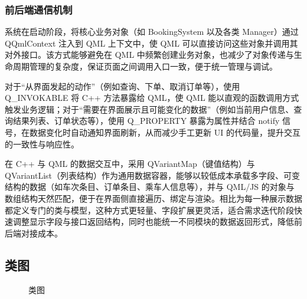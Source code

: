 \documentclass{article}
\begin{document}
			\subsubsection{前后端通信机制}
				系统在启动阶段，将核心业务对象（如 BookingSystem 以及各类 Manager）通过 QQmlContext 注入到 QML 上下文中，使 QML 可以直接访问这些对象并调用其对外接口。该方式能够避免在 QML 中频繁创建业务对象，也减少了对象传递与生命周期管理的复杂度，保证页面之间调用入口一致，便于统一管理与调试。
				
				对于“从界面发起的动作”（例如查询、下单、取消订单等），使用 Q\_INVOKABLE 将 C++ 方法暴露给 QML，使 QML 能以直观的函数调用方式触发业务逻辑；对于“需要在界面展示且可能变化的数据”（例如当前用户信息、查询结果列表、订单状态等），使用 Q\_PROPERTY 暴露为属性并结合 notify 信号，在数据变化时自动通知界面刷新，从而减少手工更新 UI 的代码量，提升交互的一致性与响应性。

				在 C++ 与 QML 的数据交互中，采用 QVariantMap（键值结构）与 QVariantList（列表结构）作为通用数据容器，能够以较低成本承载多字段、可变结构的数据（如车次条目、订单条目、乘车人信息等），并与 QML/JS 的对象与数组结构天然匹配，便于在界面侧直接遍历、绑定与渲染。相比为每一种展示数据都定义专门的类与模型，这种方式更轻量、字段扩展更灵活，适合需求迭代阶段快速调整显示字段与接口返回结构，同时也能统一不同模块的数据返回形式，降低前后端对接成本。
				
		\subsection{类图}
			\begin{figure}[H]
				\centering
				
				\caption{类图}
				\label{类图}
			\end{figure}
		
\end{document}
